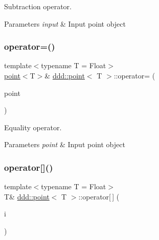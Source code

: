 Subtraction operator. 


\begin{DoxyParams}{Parameters}
{\em input} & Input point object \\
\hline
\end{DoxyParams}
\mbox{\label{classddd_1_1point_a91411a7306df6d56b5dff774ae1affea}} 
\subsubsection{\texorpdfstring{operator=()}{operator=()}}
{\footnotesize\ttfamily template$<$typename T = Float$>$ \\
\hyperlink{classddd_1_1point}{point}$<$T$>$\& \hyperlink{classddd_1_1point}{ddd\+::point}$<$ T $>$\+::operator= (\begin{DoxyParamCaption}\item[{const \hyperlink{classddd_1_1point}{point}$<$ T $>$ \&}]{point }\end{DoxyParamCaption})\hspace{0.3cm}{\ttfamily [inline]}}



Equality operator. 


\begin{DoxyParams}{Parameters}
{\em point} & Input point object \\
\hline
\end{DoxyParams}
\mbox{\label{classddd_1_1point_aabf1454e1f0496fb70c1e62852aa2595}} 
\subsubsection{\texorpdfstring{operator[]()}{operator[]()}\hspace{0.1cm}{\footnotesize\ttfamily [1/2]}}
{\footnotesize\ttfamily template$<$typename T = Float$>$ \\
T\& \hyperlink{classddd_1_1point}{ddd\+::point}$<$ T $>$\+::operator\mbox{[}$\,$\mbox{]} (\begin{DoxyParamCaption}\item[{const std\+::size\+\_\+t \&}]{i }\end{DoxyParamCaption})\hspace{0.3cm}{\ttfamily [inline]}}



